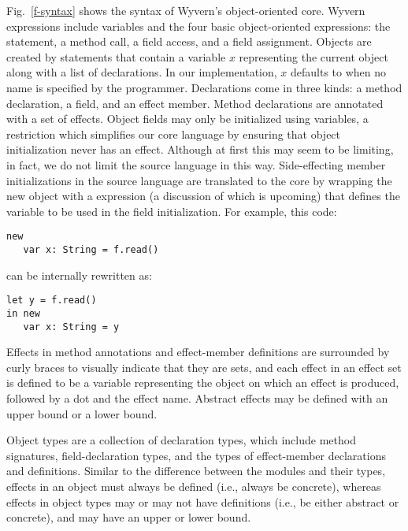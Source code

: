 Fig.~\ref{f-syntax} shows the syntax of Wyvern's object-oriented core. Wyvern expressions include variables and the four basic object-oriented expressions: the  statement, a method call, a field access, and a field assignment. Objects are created by  statements that contain a variable $x$ representing the current object along with a list of declarations.  In our implementation, $x$ defaults to  when no name is specified by the programmer.  Declarations come in three kinds: a method declaration, a field, and an effect member. Method declarations are annotated with a set of effects. Object fields may only be initialized using variables, a restriction which simplifies our core language by ensuring that object initialization never has an effect. Although at first this may seem to be limiting, in fact, we do not limit the source language in this way. Side-effecting member initializations in the source language are translated to the core by wrapping the new object with a  expression (a discussion of which is upcoming) that defines the variable to be used in the field initialization. For example, this code:

\begin{minipage}{\linewidth}
\begin{lstlisting}[xleftmargin=-5pt, numbers=none]
new
   var x: String = f.read()
\end{lstlisting}
\end{minipage}
can be internally rewritten as:

\begin{minipage}{\linewidth}
\begin{lstlisting}[xleftmargin=-5pt, numbers=none]
let y = f.read()
in new
   var x: String = y
\end{lstlisting}
\end{minipage}
Effects in method annotations and effect-member definitions are surrounded by curly braces to visually indicate that they are sets, and each effect in an effect set is defined to be a variable representing the object on which an effect is produced, followed by a dot and the effect name. Abstract effects may be defined with an upper bound or a lower bound.



Object types are a collection of declaration types, which include method signatures, field-declaration types, and the types of effect-member declarations and definitions. Similar to the difference between the modules and their types, effects in an object must always be defined (i.e., always be concrete), whereas effects in object types may or may not have definitions (i.e., be either abstract or concrete), and may have an upper or lower bound.


